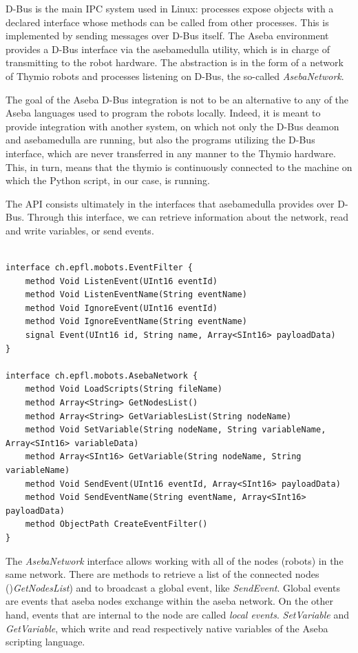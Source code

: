 D-Bus is the main IPC system used in Linux: processes expose objects with a declared interface whose methods can be called from other processes. This is implemented by sending messages over D-Bus itself. The Aseba environment provides a D-Bus interface via the asebamedulla utility, which is in charge of transmitting to the robot hardware. The abstraction is in the form of a network of Thymio robots and processes listening on D-Bus, the so-called \emph{AsebaNetwork}.

The goal of the Aseba D-Bus integration is not to be an alternative to any of the Aseba languages used to program the robots locally. Indeed, it is meant to provide integration with another system, on which not only the D-Bus deamon and asebamedulla are running, but also the programs utilizing the D-Bus interface, which are never transferred in any manner to the Thymio hardware. This, in turn, means that the thymio is continuously connected to the machine on which the Python script, in our case, is running.

The API consists ultimately in the interfaces that asebamedulla provides over D-Bus. Through this interface, we can retrieve information about the network, read and write variables, or send events.

\begin{lstlisting}[style=C-color, caption={The API that asebamedulla provides over D-Bus},label={Asebamedulla API}]

interface ch.epfl.mobots.EventFilter {
    method Void ListenEvent(UInt16 eventId)
    method Void ListenEventName(String eventName)
    method Void IgnoreEvent(UInt16 eventId)
    method Void IgnoreEventName(String eventName)
    signal Event(UInt16 id, String name, Array<SInt16> payloadData)
}

interface ch.epfl.mobots.AsebaNetwork {
    method Void LoadScripts(String fileName)
    method Array<String> GetNodesList()
    method Array<String> GetVariablesList(String nodeName)
    method Void SetVariable(String nodeName, String variableName, Array<SInt16> variableData)
    method Array<SInt16> GetVariable(String nodeName, String variableName)
    method Void SendEvent(UInt16 eventId, Array<SInt16> payloadData)
    method Void SendEventName(String eventName, Array<SInt16> payloadData)
    method ObjectPath CreateEventFilter()
}
\end{lstlisting}

The \emph{AsebaNetwork} interface allows working with all of the nodes (robots) in the same network. There are methods to retrieve a list of the connected nodes ()\emph{GetNodesList}) and to broadcast a global event, like \emph{SendEvent}. Global events are events that aseba nodes exchange within the aseba network. On the other hand, events that are internal to the node are called \emph{local events}. \emph{SetVariable} and \emph{GetVariable}, which write and read respectively native variables of the Aseba scripting language.

